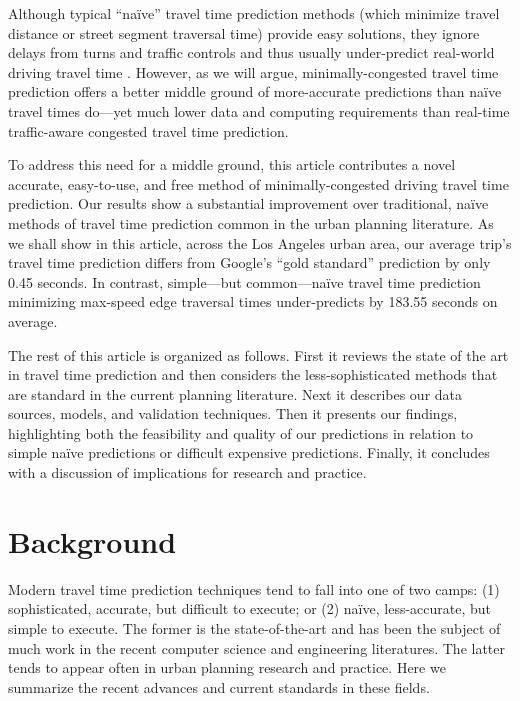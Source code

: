 \documentclass[12pt,letterpaper]{article} %
\begin{document}
Although typical \enquote{naïve} travel time prediction methods (which minimize travel distance or street segment traversal time) provide easy solutions, they ignore delays from turns and traffic controls and thus usually under-predict real-world driving travel time \citep{ludwig2023traffic,salonen2013modelling,yiannakoulias2013estimating}. However, as we will argue, minimally-congested travel time prediction offers a better middle ground of more-accurate predictions than naïve travel times do---yet much lower data and computing requirements than real-time traffic-aware congested travel time prediction.

To address this need for a middle ground, this article contributes a novel accurate, easy-to-use, and free method of minimally-congested driving travel time prediction. Our results show a substantial improvement over traditional, naïve methods of travel time prediction common in the urban planning literature. As we shall show in this article, across the Los Angeles urban area, our average trip's travel time prediction differs from Google's \enquote{gold standard} prediction by only 0.45 seconds. In contrast, simple---but common---naïve travel time prediction minimizing max-speed edge traversal times under-predicts by 183.55 seconds on average.

The rest of this article is organized as follows. First it reviews the state of the art in travel time prediction and then considers the less-sophisticated methods that are standard in the current planning literature. Next it describes our data sources, models, and validation techniques. Then it presents our findings, highlighting both the feasibility and quality of our predictions in relation to simple naïve predictions or difficult expensive predictions. Finally, it concludes with a discussion of implications for research and practice.

\section{Background}

Modern travel time prediction techniques tend to fall into one of two camps: (1) sophisticated, accurate, but difficult to execute; or (2) naïve, less-accurate, but simple to execute. The former is the state-of-the-art and has been the subject of much work in the recent computer science and engineering literatures. The latter tends to appear often in urban planning research and practice. Here we summarize the recent advances and current standards in these fields.
\end{document}
